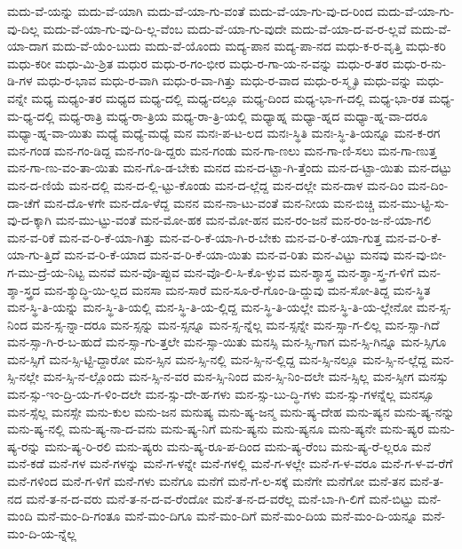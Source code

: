 {ಮದು-ವೆ-ಯನ್ನು
ಮದು-ವೆ-ಯಾಗಿ
ಮದು-ವೆ-ಯಾ-ಗು-ವಂತೆ
ಮದು-ವೆ-ಯಾ-ಗು-ವು-ದ-ರಿಂದ
ಮದು-ವೆ-ಯಾ-ಗು-ವು-ದಿಲ್ಲ
ಮದು-ವೆ-ಯಾ-ಗು-ವು-ದಿ-ಲ್ಲ-ವೆಂಬ
ಮದು-ವೆ-ಯಾ-ಗು-ವುದೇ
ಮದು-ವೆ-ಯಾ-ದ-ವ-ರ-ಲ್ಲವೆ
ಮದು-ವೆ-ಯಾ-ದಾಗ
ಮದು-ವೆ-ಯೆಂ-ಬುದು
ಮದು-ವೆ-ಯೊಂದು
ಮದ್ಯ-ಪಾನ
ಮದ್ಯ-ಪಾ-ನದ
ಮಧು-ಕ-ರ-ವೃತ್ತಿ
ಮಧು-ಕರಿ
ಮಧು-ಕರೀ
ಮಧು-ಮಿ-ಶ್ರಿತ
ಮಧುರ
ಮಧು-ರ-ಗಂ-ಭೀರ
ಮಧು-ರ-ಗಾ-ಯ-ನ-ವನ್ನು
ಮಧು-ರ-ತರ
ಮಧು-ರ-ನು-ಡಿ-ಗಳ
ಮಧು-ರ-ಭಾವ
ಮಧು-ರ-ವಾಗಿ
ಮಧು-ರ-ವಾ-ಗಿತ್ತು
ಮಧು-ರ-ವಾದ
ಮಧು-ರ-ಸ್ಮೃತಿ
ಮಧು-ವನ್ನು
ಮಧು-ವನ್ನೇ
ಮಧ್ಯ
ಮಧ್ಯಂ-ತರ
ಮಧ್ಯದ
ಮಧ್ಯ-ದಲ್ಲಿ
ಮಧ್ಯ-ದಲ್ಲೂ
ಮಧ್ಯ-ದಿಂದ
ಮಧ್ಯ-ಭಾ-ಗ-ದಲ್ಲಿ
ಮಧ್ಯ-ಭಾ-ರತ
ಮಧ್ಯ-ಮ-ಧ್ಯ-ದಲ್ಲಿ
ಮಧ್ಯ-ರಾತ್ರಿ
ಮಧ್ಯ-ರಾ-ತ್ರಿಯ
ಮಧ್ಯ-ರಾ-ತ್ರಿ-ಯಲ್ಲಿ
ಮಧ್ಯಾಹ್ನ
ಮಧ್ಯಾ-ಹ್ನದ
ಮಧ್ಯಾ-ಹ್ನ-ವಾ-ದರೂ
ಮಧ್ಯಾ-ಹ್ನ-ವಾ-ಯಿತು
ಮಧ್ಯೆ
ಮಧ್ಯೆ-ಮಧ್ಯೆ
ಮನ
ಮನಃ-ಪ-ಟ-ಲದ
ಮನಃ-ಸ್ಥಿತಿ
ಮನಃ-ಸ್ಥಿ-ತಿ-ಯನ್ನೂ
ಮನ-ಕ-ರಗ
ಮನ-ಗಂಡ
ಮನ-ಗಂ-ಡಿದ್ದ
ಮನ-ಗಂ-ಡಿ-ದ್ದರು
ಮನ-ಗಂಡು
ಮನ-ಗಾ-ಣಲು
ಮನ-ಗಾ-ಣಿ-ಸಲು
ಮನ-ಗಾ-ಣುತ್ತ
ಮನ-ಗಾ-ಣು-ವಂ-ತಾ-ಯಿತು
ಮನ-ಗೊ-ಡ-ಬೇಕು
ಮನದ
ಮನ-ದ-ಟ್ಟಾ-ಗಿ-ತ್ತೆಂದು
ಮನ-ದ-ಟ್ಟಾ-ಯಿತು
ಮನ-ದಟ್ಟು
ಮನ-ದ-ಣಿಯೆ
ಮನ-ದಲ್ಲಿ
ಮನ-ದ-ಲ್ಲಿ-ಟ್ಟು-ಕೊಂಡು
ಮನ-ದ-ಲ್ಲೆದ್ದ
ಮನ-ದಲ್ಲೇ
ಮನ-ದಾಳ
ಮನ-ದಿಂ
ಮನ-ದಿಂ-ದಾ-ಚೆಗೆ
ಮನ-ದೊ-ಳಗೇ
ಮನ-ದೊ-ಳೆದ್ದ
ಮನನ
ಮನ-ನಾ-ಟು-ವಂತೆ
ಮನ-ನೀಯ
ಮನ-ಬಿಚ್ಚಿ
ಮನ-ಮು-ಟ್ಟಿ-ಸು-ವು-ದ-ಕ್ಕಾಗಿ
ಮನ-ಮು-ಟ್ಟು-ವಂತೆ
ಮನ-ಮೋ-ಹಕ
ಮನ-ಮೋ-ಹನ
ಮನ-ರಂ-ಜನೆ
ಮನ-ರಂ-ಜ-ನೆ-ಯಾ-ಗಲಿ
ಮನ-ವ-ರಿಕೆ
ಮನ-ವ-ರಿ-ಕೆ-ಯಾ-ಗಿತ್ತು
ಮನ-ವ-ರಿ-ಕೆ-ಯಾ-ಗಿ-ರ-ಬೇಕು
ಮನ-ವ-ರಿ-ಕೆ-ಯಾ-ಗುತ್ತ
ಮನ-ವ-ರಿ-ಕೆ-ಯಾ-ಗು-ತ್ತಿದೆ
ಮನ-ವ-ರಿ-ಕೆ-ಯಾದ
ಮನ-ವ-ರಿ-ಕೆ-ಯಾ-ಯಿತು
ಮನ-ವ-ರಿತು
ಮನ-ವಿಟ್ಟು
ಮನವು
ಮನ-ವು-ಬೀ-ಗ-ಮು-ದ್ರೆ-ಯ-ನಿಟ್ಟ
ಮನವೆ
ಮನ-ವೊ-ಪ್ಪುವ
ಮನ-ವೊ-ಲಿ-ಸಿ-ಕೊ-ಳ್ಳುವ
ಮನ-ಶ್ಶಾಸ್ತ್ರ
ಮನ-ಶ್ಶಾ-ಸ್ತ್ರ-ಗ-ಳಿಗೆ
ಮನ-ಶ್ಶಾ-ಸ್ತ್ರದ
ಮನ-ಶ್ಶುದ್ಧಿ-ಯಿ-ಲ್ಲದ
ಮನಸಾ
ಮನ-ಸಾರೆ
ಮನ-ಸೂ-ರೆ-ಗೊಂ-ಡಿ-ದ್ದುವು
ಮನ-ಸೋ-ತಿದ್ದ
ಮನ-ಸ್ಥಿತ
ಮನ-ಸ್ಥಿ-ತಿ-ಯನ್ನು
ಮನ-ಸ್ಥಿ-ತಿ-ಯಲ್ಲಿ
ಮನ-ಸ್ಥಿ-ತಿ-ಯ-ಲ್ಲಿದ್ದ
ಮನ-ಸ್ಥಿ-ತಿ-ಯಲ್ಲೇ
ಮನ-ಸ್ಥಿ-ತಿ-ಯ-ಲ್ಲೇನೋ
ಮನ-ಸ್ಸ-ನಿಂದ
ಮನ-ಸ್ಸ-ನ್ನಾ-ದರೂ
ಮನ-ಸ್ಸನ್ನು
ಮನ-ಸ್ಸನ್ನೂ
ಮನ-ಸ್ಸ-ನ್ನೆಲ್ಲ
ಮನ-ಸ್ಸನ್ನೇ
ಮನ-ಸ್ಸಾ-ಗ-ಲಿಲ್ಲ
ಮನ-ಸ್ಸಾ-ಗಿದೆ
ಮನ-ಸ್ಸಾ-ಗಿ-ರ-ಬ-ಹುದೆ
ಮನ-ಸ್ಸಾ-ಗು-ತ್ತಲೇ
ಮನ-ಸ್ಸಾ-ಯಿತು
ಮನಸ್ಸಿ
ಮನ-ಸ್ಸಿ-ಗಾಗ
ಮನ-ಸ್ಸಿ-ಗಿನ್ನೂ
ಮನ-ಸ್ಸಿಗೂ
ಮನ-ಸ್ಸಿಗೆ
ಮನ-ಸ್ಸಿ-ಟ್ಟಿ-ದ್ದಾರೋ
ಮನ-ಸ್ಸಿನ
ಮನ-ಸ್ಸಿ-ನಲ್ಲಿ
ಮನ-ಸ್ಸಿ-ನ-ಲ್ಲಿದ್ದ
ಮನ-ಸ್ಸಿ-ನಲ್ಲೂ
ಮನ-ಸ್ಸಿ-ನ-ಲ್ಲೆದ್ದ
ಮನ-ಸ್ಸಿ-ನಲ್ಲೇ
ಮನ-ಸ್ಸಿ-ನ-ಲ್ಲೊಂದು
ಮನ-ಸ್ಸಿ-ನ-ವರ
ಮನ-ಸ್ಸಿ-ನಿಂದ
ಮನ-ಸ್ಸಿ-ನಿಂ-ದಲೇ
ಮನ-ಸ್ಸಿಲ್ಲ
ಮನ-ಸ್ಸೀಗ
ಮನಸ್ಸು
ಮನ-ಸ್ಸು-ಇಂ-ದ್ರಿ-ಯ-ಗ-ಳಿಂ-ದಲೇ
ಮನ-ಸ್ಸು-ದೇ-ಹ-ಗಳು
ಮನ-ಸ್ಸು-ಬು-ದ್ಧಿ-ಗಳು
ಮನ-ಸ್ಸು-ಗಳನ್ನೆಲ್ಲ
ಮನಸ್ಸೂ
ಮನ-ಸ್ಸೆಲ್ಲ
ಮನಸ್ಸೇ
ಮನು-ಕುಲ
ಮನು-ಜನ
ಮನುಷ್ಯ
ಮನು-ಷ್ಯ-ಜನ್ಮ
ಮನು-ಷ್ಯ-ದೇಹ
ಮನು-ಷ್ಯನ
ಮನು-ಷ್ಯ-ನನ್ನು
ಮನು-ಷ್ಯ-ನಲ್ಲಿ
ಮನು-ಷ್ಯ-ನಾ-ದ-ವನು
ಮನು-ಷ್ಯ-ನಿಗೆ
ಮನು-ಷ್ಯನು
ಮನು-ಷ್ಯನೂ
ಮನು-ಷ್ಯನೇ
ಮನು-ಷ್ಯರ
ಮನು-ಷ್ಯ-ರನ್ನು
ಮನು-ಷ್ಯ-ರಿ-ರಲಿ
ಮನು-ಷ್ಯರು
ಮನು-ಷ್ಯ-ರೂ-ಪ-ದಿಂದ
ಮನು-ಷ್ಯ-ರೆಂಬ
ಮನು-ಷ್ಯ-ರೆ-ಲ್ಲರೂ
ಮನೆ
ಮನೆ-ಕಡೆ
ಮನೆ-ಗಳ
ಮನೆ-ಗಳನ್ನು
ಮನೆ-ಗ-ಳನ್ನೇ
ಮನೆ-ಗಳಲ್ಲಿ
ಮನೆ-ಗ-ಳಲ್ಲೇ
ಮನೆ-ಗ-ಳ-ವರೂ
ಮನೆ-ಗ-ಳ-ವ-ರೆಗೆ
ಮನೆ-ಗಳಿಂದ
ಮನೆ-ಗ-ಳಿಗೆ
ಮನೆ-ಗಳು
ಮನೆಗೂ
ಮನೆಗೆ
ಮನೆ-ಗೆ-ಲ-ಸಕ್ಕೆ
ಮನೆಗೇ
ಮನೆಗೋ
ಮನೆ-ತನ
ಮನೆ-ತ-ನದ
ಮನೆ-ತ-ನ-ದ-ವರು
ಮನೆ-ತ-ನ-ದ-ವ-ರೆಂದೋ
ಮನೆ-ತ-ನ-ದ-ವರೆಲ್ಲ
ಮನೆ-ಬಾ-ಗಿ-ಲಿಗೆ
ಮನೆ-ಬಿಟ್ಟು
ಮನೆ-ಮಂದಿ
ಮನೆ-ಮಂ-ದಿ-ಗಂತೂ
ಮನೆ-ಮಂ-ದಿಗೂ
ಮನೆ-ಮಂ-ದಿಗೆ
ಮನೆ-ಮಂ-ದಿಯ
ಮನೆ-ಮಂ-ದಿ-ಯನ್ನೂ
ಮನೆ-ಮಂ-ದಿ-ಯ-ನ್ನೆಲ್ಲ
}
